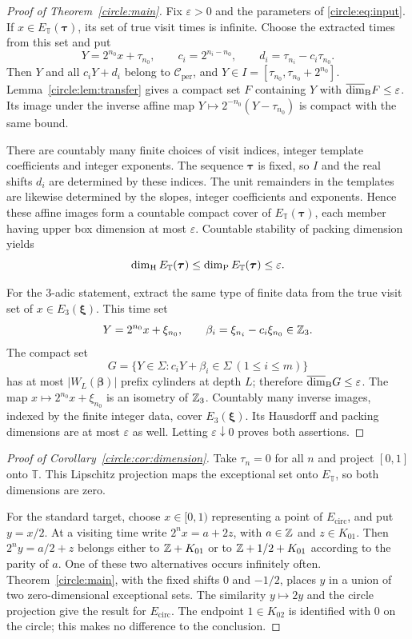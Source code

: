\begin{proof}[Proof of Theorem~\ref{circle:main}]
Fix $\varepsilon>0$ and the parameters of
\eqref{circle:eq:input}. If $x\in E_{\mathbb T}(\boldsymbol\tau)$,
its set of true visit times is infinite. Choose the extracted times
from this set and put
\[
 Y=2^{n_0}x+\tau_{n_0},\qquad
 c_i=2^{n_i-n_0},\qquad d_i=\tau_{n_i}-c_i\tau_{n_0}.
\]
Then $Y$ and all $c_iY+d_i$ belong to $\mathcal C_{\mathrm{per}}$,
and $Y\in I=[\tau_{n_0},\tau_{n_0}+2^{n_0}]$.
Lemma~\ref{circle:lem:transfer} gives a compact set $F$ containing
$Y$ with $\overline{\dim}_{\mathrm B} F\le\varepsilon$. Its image under the inverse affine map
$Y\mapsto2^{-n_0}(Y-\tau_{n_0})$ is compact with the same bound.

There are countably many finite choices of visit indices, integer
template coefficients and integer exponents. The sequence
$\boldsymbol\tau$ is fixed, so $I$ and the real shifts $d_i$ are
determined by these indices. The unit remainders in the templates
are likewise determined by the slopes, integer coefficients and
exponents. Hence these affine images form a countable compact cover
of $E_{\mathbb T}(\boldsymbol\tau)$, each member having upper box
dimension at most $\varepsilon$. Countable stability of packing
dimension yields
\[
 \dim_{\mathrm H} E_{\mathbb T}(\boldsymbol\tau)
 \le\dim_{\mathrm P} E_{\mathbb T}(\boldsymbol\tau)\le\varepsilon.
\]

For the $3$-adic statement, extract the same type of finite data from
the true visit set of $x\in E_3(\boldsymbol\xi)$. This time set
\[
 Y=2^{n_0}x+\xi_{n_0},\qquad
 \beta_i=\xi_{n_i}-c_i\xi_{n_0}\in\mathbb Z_3.
\]
The compact set
\[
 G=\{Y\in\Sigma:c_iY+\beta_i\in\Sigma\ (1\le i\le m)\}
\]
has at most $|W_L(\boldsymbol\beta)|$ prefix cylinders at depth $L$;
therefore $\overline{\dim}_{\mathrm B} G\le\varepsilon$. The map
$x\mapsto2^{n_0}x+\xi_{n_0}$ is an isometry of $\mathbb Z_3$.
Countably many inverse images, indexed by the finite integer data,
cover $E_3(\boldsymbol\xi)$. Its Hausdorff and packing dimensions
are at most $\varepsilon$ as well. Letting $\varepsilon\downarrow0$
proves both assertions.
\end{proof}

\begin{proof}[Proof of Corollary~\ref{circle:cor:dimension}]
Take $\tau_n=0$ for all $n$ and project $[0,1]$ onto $\mathbb T$.
This Lipschitz projection maps the exceptional set onto
$E_{\mathbb T}$, so both dimensions are zero.

For the standard target, choose $x\in[0,1)$ representing a point of
$E_{\mathrm{circ}}$, and put $y=x/2$. At a visiting time write
$2^nx=a+2z$, with $a\in\mathbb Z$ and $z\in K_{01}$. Then
$2^ny=a/2+z$ belongs either to $\mathbb Z+K_{01}$ or to
$\mathbb Z+1/2+K_{01}$ according to the parity of $a$. One of these two
alternatives occurs infinitely often. Theorem~\ref{circle:main},
with the fixed shifts $0$ and $-1/2$, places $y$ in a union of two
zero-dimensional exceptional sets. The similarity $y\mapsto2y$ and
the circle projection give the result for $E_{\mathrm{circ}}$.
The endpoint $1\in K_{02}$ is identified with $0$ on the circle;
this makes no difference to the conclusion.
\end{proof}


